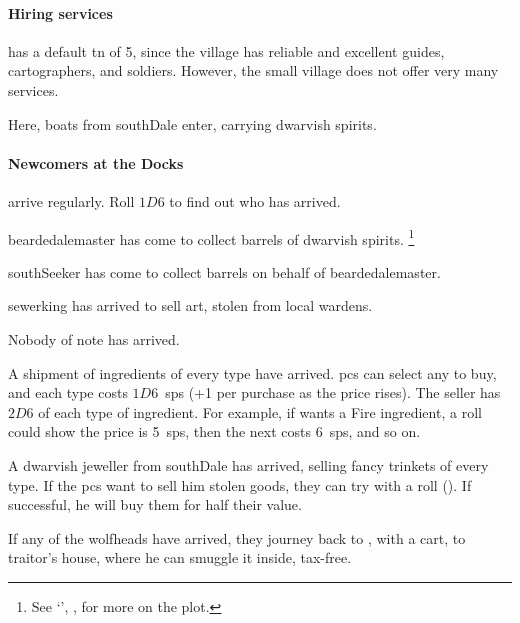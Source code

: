 \paragraph{Hiring services}
has a default \gls{tn} of 5, since the \gls{village} has reliable and excellent guides, cartographers, and soldiers.
However, the small \gls{village} does not offer very many services.


Here, boats from \gls{southDale} enter, carrying dwarvish spirits.

\paragraph{Newcomers at the Docks}
arrive regularly.
Roll $1D6$ to find out who has arrived.

\begin{dlist}
  \item
  \Gls{beardedalemaster} has come to collect barrels of dwarvish spirits.%
  \footnote{See `', , for more on the plot.}
  \item
  \Gls{southSeeker} has come to collect barrels on behalf of \gls{beardedalemaster}.
  \item
  \Gls{sewerking} has arrived to sell art, stolen from local \glspl{warden}.
  \item
  Nobody of note has arrived.
  \item
  A shipment of \glspl{ingredient} of every type have arrived.
  \Glspl{pc} can select any to buy, and each type costs $1D6$~\glspl{sp} (+1 per purchase as the price rises).
  The seller has $2D6$ of each type of \gls{ingredient}.
  For example, if  wants a Fire \gls{ingredient}, a roll could show the price is 5~\glspl{sp}, then the next costs 6~\glspl{sp}, and so on.
  \item
  A dwarvish jeweller from \gls{southDale} has arrived, selling fancy trinkets of every type.
  If the \glspl{pc} want to sell him stolen goods, they can try with a  roll (\tn[12]).
  If successful, he will buy them for half their value.
\end{dlist}

If any of the \glspl{wolfhead} have arrived, they journey back to , with a cart, to \gls{traitor}'s house, where he can smuggle it inside, tax-free.

